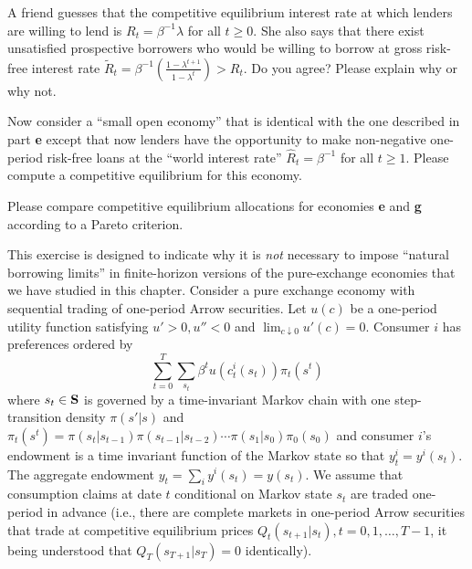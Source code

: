\medskip
{} A friend guesses that the competitive equilibrium interest rate at which lenders are willing 
to lend is $R_t = \beta^{-1} \lambda $ for all $t \geq 0$.  She also says that there exist unsatisfied prospective borrowers
who would be willing to borrow at gross risk-free interest rate $\tilde R_t = \beta^{-1} \left({\frac{1 - \lambda^{t+1}}
{1 - \lambda^t}}\right) > R_t$.  Do you agree? Please explain why or why not.

\medskip
{} Now consider a ``small open economy'' that is identical with the one described in part {\bf e} except
that now lenders have the opportunity to make non-negative  one-period risk-free loans at the ``world interest rate''
$\hat R_t = \beta^{-1}$ for all $t \geq 1$.  Please compute a competitive equilibrium for this economy.  

\medskip
{} Please compare competitive equilibrium allocations for economies {\bf e} and {\bf g} according to a Pareto
criterion.



\medskip

 
\medskip

\noindent This exercise is designed to  indicate why it is {\it not\/} necessary to impose ``natural borrowing limits'' 
in  finite-horizon versions of the pure-exchange economies that we have studied in this chapter. Consider a pure exchange economy with sequential trading of one-period Arrow securities. Let $u(c)$ be a one-period utility 
function satisfying $u' > 0, u'' < 0$ and $\lim_{c \downarrow 0} u'(c) = 0$.
Consumer $i$ has preferences ordered by
$$ \sum_{t=0}^T \sum_{s_t} \beta^t u(c^i_t(s_t)) \pi_t(s^t)  $$
where $s_t \in {\bf S}$ is governed by a time-invariant Markov chain with one step-transition density
$\pi(s' | s)$ and $\pi_t(s^t) = \pi(s_t| s_{t-1}) \pi(s_{t-1}| s_{t-2}) \cdots \pi(s_1 | s_0) \pi_0(s_0)$ and
consumer $i$'s endowment is a time invariant function of the Markov state so that
$y_t^i = y^i(s_t)$. The aggregate endowment $y_t = \sum_i y^i(s_t) = y(s_t)$.   We assume that consumption
claims at date $t$ conditional on Markov state $s_t$ are traded one-period in advance (i.e., there are complete markets in
one-period Arrow securities that trade at competitive equilibrium prices $Q_t(s_{t+1} | s_t), t =0, 1, \ldots, T-1$, it being
understood that $Q_T(s_{T+1}|s_T) = 0$ identically). 


